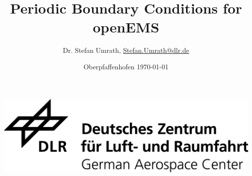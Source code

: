 \documentclass[a4paper,12pt]{scrartcl}  %
\title{Periodic Boundary Conditions for openEMS}
\author[1]{Dr. Stefan Umrath, \href{mailto:Stefan.Umrath@dlr.de}{Stefan.Umrath@dlr.de}}
\affil[1]{German Aerospace Center (DLR)}
\date{Oberpfaffenhofen \today{} \vspace{3cm}}
\begin{document}
\maketitle
\begin{center}
\includegraphics[width= 0.75\linewidth]{./media/DLR_Logo_engl_schwarz.jpg}
\end{center}

\newpage
\tableofcontents 
\newpage






\newpage



\printbibliography
\end{document}
